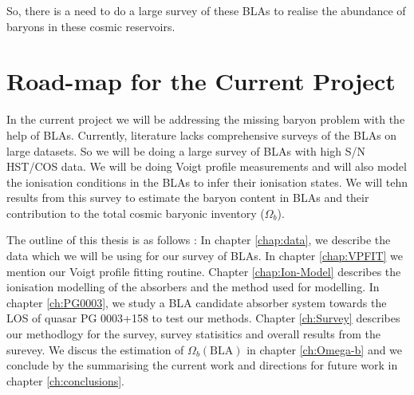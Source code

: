 So, there is a need to do a large survey of these BLAs to realise the abundance of baryons in these cosmic reservoirs. 

\section{Road-map for the Current Project}

In the current project we will be addressing the missing baryon problem with the help of BLAs. Currently, literature lacks comprehensive surveys of the BLAs on large datasets. So we will be doing a large survey of BLAs with high S/N HST/COS data. We will be doing Voigt profile measurements and will also model the ionisation conditions in the BLAs to infer their ionisation states. We will tehn results from this survey to  estimate the baryon content in BLAs and their  contribution to the total cosmic baryonic inventory ($\Omega_b$). 

The outline of this thesis is as follows : In chapter \ref{chap:data}, we describe the data which we will be using for our survey of BLAs. In chapter \ref{chap:VPFIT} we mention our Voigt profile fitting routine. Chapter \ref{chap:Ion-Model} describes the ionisation modelling of the absorbers and the method used for modelling. In chapter \ref{ch:PG0003}, we study a BLA candidate absorber system towards the LOS of quasar PG 0003+158 to test our methods. Chapter \ref{ch:Survey} describes our methodlogy for the survey, survey statisitics and overall results from the surevey. We discus the estimation of $\Omega_b(\text{BLA})$ in chapter \ref{ch:Omega-b} and we conclude by the summarising the current work and directions for future work in chapter \ref{ch:conclusions}. 
